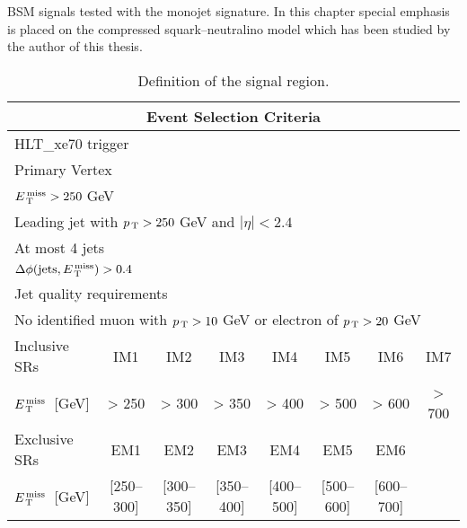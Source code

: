 BSM signals tested with the monojet signature. In this chapter special emphasis
is placed on the compressed squark--neutralino model which has been studied by
the author of this thesis.
\begin{table}[!th]
  \centering
  \begin{tabular}{@{}l@{}c@{}c@{}c@{}c@{}c@{}c@{}c}
    \toprule
    \multicolumn{8}{c}{Event Selection Criteria} \\
    \midrule \midrule
    \multicolumn{8}{l}{HLT\_xe70 trigger} \\
    \multicolumn{8}{l}{Primary Vertex} \\
    \multicolumn{8}{l}{$E_\mathrm{\, T}^\mathrm{\, miss} > 250~$GeV} \\
    \multicolumn{8}{l}{Leading jet with $p_\mathrm{\, T} > 250~$GeV and $|\eta| < 2.4$} \\
    \multicolumn{8}{l}{At most 4 jets} \\
    \multicolumn{8}{l}{$\Delta \phi (\mathrm{jets}, E_\mathrm{\, T}^\mathrm{\, miss}) > 0.4$} \\
    \multicolumn{8}{l}{Jet quality requirements} \\
    \multicolumn{8}{l}{No identified muon with $p_\mathrm{\, T} > 10~$GeV or electron of
    $p_\mathrm{\, T} > 20~$GeV} \\
    \midrule
    Inclusive SRs & IM1 & IM2 & IM3 & IM4 & IM5 & IM6 & IM7 \\
    $E_\mathrm{\, T}^\mathrm{\, miss}$~[GeV] & > 250 & > 300 & > 350 & > 400 & > 500 & > 600 & > 700 \\
    \midrule
    Exclusive SRs & EM1 & EM2 & EM3 & EM4 & EM5 & EM6 \\
    $E_\mathrm{\, T}^\mathrm{\, miss}$~[GeV] & [250--300] & [300--350] & [350--400] & [400--500] &
    [500--600] & [600--700] \\
    \bottomrule
  \end{tabular}
  \caption{Definition of the signal region.}
  \label{tab:event_selection}
\end{table}
